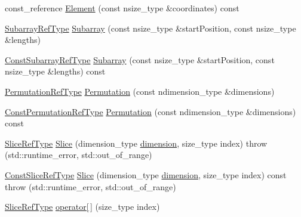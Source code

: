 \begin{DoxyCompactItemize}
\item 
const\+\_\+reference \hyperlink{classvct_dynamic_n_array_base_aede976966fffbaa5edb653a079f7c97c}{Element} (const nsize\+\_\+type \&coordinates) const 
\item 
\hyperlink{classvct_dynamic_const_n_array_base_a4db8630795191b1854a5af85b9327ee3}{Subarray\+Ref\+Type} \hyperlink{classvct_dynamic_n_array_base_af9c93b8d23bce2c21877c17c5cfb37f3}{Subarray} (const nsize\+\_\+type \&start\+Position, const nsize\+\_\+type \&lengths)
\item 
\hyperlink{classvct_dynamic_const_n_array_base_a4b3508630e409eda4f0d2f55d17d89a4}{Const\+Subarray\+Ref\+Type} \hyperlink{classvct_dynamic_n_array_base_a278d54b4dab29f2a5e1debc8d9d15947}{Subarray} (const nsize\+\_\+type \&start\+Position, const nsize\+\_\+type \&lengths) const 
\item 
\hyperlink{classvct_dynamic_const_n_array_base_a968acf814b972b47aa2ea39105e67fb3}{Permutation\+Ref\+Type} \hyperlink{classvct_dynamic_n_array_base_ac321d29709503ee3fd2e54d71a812dfa}{Permutation} (const ndimension\+\_\+type \&dimensions)
\item 
\hyperlink{classvct_dynamic_const_n_array_base_a412fcb88d50ea2e1d809efab113968fc}{Const\+Permutation\+Ref\+Type} \hyperlink{classvct_dynamic_n_array_base_a081bce5e64a529f2ff318fed133babab}{Permutation} (const ndimension\+\_\+type \&dimensions) const 
\item 
\hyperlink{classvct_dynamic_const_n_array_base_a4170184942c320b2402ba8dfdab9a915}{Slice\+Ref\+Type} \hyperlink{classvct_dynamic_n_array_base_a63ab912937e693a8890130177fa56651}{Slice} (dimension\+\_\+type \hyperlink{classvct_dynamic_const_n_array_base_aad976ad48dc9b1006d9e2729195f0b7c}{dimension}, size\+\_\+type index)  throw (std\+::runtime\+\_\+error, std\+::out\+\_\+of\+\_\+range)
\item 
\hyperlink{classvct_dynamic_const_n_array_base_ad4a09eb0789ba4c5b8d799fbe0ee3d79}{Const\+Slice\+Ref\+Type} \hyperlink{classvct_dynamic_n_array_base_a04dbc6f6be3ab76bfd62b77f424028c6}{Slice} (dimension\+\_\+type \hyperlink{classvct_dynamic_const_n_array_base_aad976ad48dc9b1006d9e2729195f0b7c}{dimension}, size\+\_\+type index) const   throw (std\+::runtime\+\_\+error, std\+::out\+\_\+of\+\_\+range)
\item 
\hyperlink{classvct_dynamic_const_n_array_base_a4170184942c320b2402ba8dfdab9a915}{Slice\+Ref\+Type} \hyperlink{classvct_dynamic_n_array_base_a419ca05b928751d175878cda0868e562}{operator\mbox{[}$\,$\mbox{]}} (size\+\_\+type index)
\item 

\end{DoxyCompactItemize}
